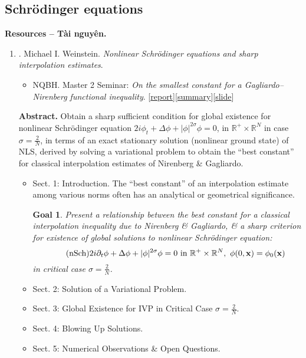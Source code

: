 \documentclass{article}
\newtheorem{goal}{Goal}
\begin{document}
\subsection{Schr\"odinger equations}
\textbf{\textsf{Resources -- Tài nguyên.}}
\begin{enumerate}
	\item \cite{Weinstein1983}. {\sc Michael I. Weinstein}. {\it Nonlinear {S}chr\"{o}dinger equations and sharp interpolation estimates}.
	\begin{itemize}
		\item NQBH. Master 2 Seminar: {\it On the smallest constant for a Gagliardo--Nirenberg functional inequality}. [\href{https://github.com/NQBH/advanced_STEM_beyond/blob/main/Master_of_Science/Master_Seminar/NQBH_Master_seminar.pdf}{report}][\href{https://github.com/NQBH/advanced_STEM_beyond/blob/main/Master_of_Science/Master_Seminar/NQBH_Master_seminar_summary.pdf}{summary}][\href{https://github.com/NQBH/advanced_STEM_beyond/blob/main/Master_of_Science/Master_Seminar/NQBH_Master_seminar_slide.pdf}{slide}]
	\end{itemize}
	{\bf Abstract.} Obtain a sharp sufficient condition for global existence for nonlinear Schr\"odinger equation $2i\phi_t + \Delta\phi + |\phi|^{2\sigma}\phi = 0$, in $\mathbb{R}^+\times\mathbb{R}^N$ in case $\sigma = \frac{2}{N}$, in terms of an exact stationary solution (nonlinear ground state) of NLS, derived by solving a variational problem to obtain the ``best constant'' for classical interpolation estimates of Nirenberg \& Gagliardo.
	\begin{itemize}
		\item {\sf Sect. 1: Introduction.} The ``best constant'' of an interpolation estimate among various norms often has an analytical or geometrical significance.
		\begin{goal}
			Present a relationship between the best constant for a classical interpolation inequality due to Nirenberg \& Gagliardo, \& a sharp criterion for existence of global solutions to nonlinear Schr\"odinger equation:
			\begin{equation}
				\label{nonlinear Schrodinger}
				\tag{nSch}
				2i\partial_t\phi + \Delta\phi + |\phi|^{2\sigma}\phi = 0\mbox{ in }\mathbb{R}^+\times\mathbb{R}^N,\ \phi(0,{\bf x}) = \phi_0({\bf x})
			\end{equation}
			in critical case $\sigma = \frac{2}{N}$.
		\end{goal}
		\item {\sf Sect. 2: Solution of a Variational Problem.}
		\item {\sf Sect. 3: Global Existence for IVP in Critical Case $\sigma = \frac{2}{N}$.}
		\item {\sf Sect. 4: Blowing Up Solutions.}
		\item {\sf Sect. 5: Numerical Observations \& Open Questions.}
	\end{itemize}
\end{enumerate}
\end{document}
